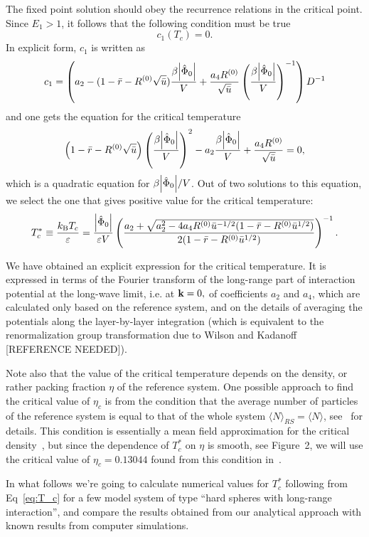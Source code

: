 The fixed point solution should obey the recurrence relations in the critical point. Since $E_1 > 1$, it follows that the following condition must be true
\begin{equation*}
	c_1(T_c) = 0.
\end{equation*}
In explicit form, $c_1$ is written as
\begin{equation*}
	c_1 = 
	\left(
		a_2 - (1 - \bar{r} - R^{(0)}\sqrt{\bar{u}})\frac{\beta \abs{\hat{\Phi}_0}}{V} + \frac{a_4 R^{(0)}}{\sqrt{\bar{u}}} \left(\frac{\beta \abs{\hat{\Phi}_0}}{V}\right)^{-1}
	\right) D^{-1}
\end{equation*}
and one gets the equation for the critical temperature
\begin{equation}
	\left(1 - \bar{r} - R^{(0)}\sqrt{\bar{u}} \right) \left(\frac{\beta \abs{\hat{\Phi}_0}}{V}\right)^{2} - a_2  \frac{\beta \abs{\hat{\Phi}_0}}{V} + \frac{a_4 R^{(0)}}{\sqrt{\bar{u}}} = 0,
\end{equation}
which is a quadratic equation for $\beta \abs{\hat{\Phi}_0}/{V}$. Out of two solutions to this equation, we select the one that gives positive value for the critical temperature:
\begin{equation}
	\label{eq:T_c}
	T^*_c \equiv \frac{k_{\rm B} T_c}{\varepsilon} = \frac{\abs{\hat{\Phi}_0}}{\varepsilon V}
	\left(
		\frac
		{a_2 + \sqrt{a_2^2 - 4 a_4 R^{(0)}\bar{u}^{-1/2} (1 - \bar{r} - R^{(0)}\bar{u}^{1/2}) } }
		{2(1 - \bar{r} - R^{(0)}\bar{u}^{1/2})}
	\right)^{-1}.
\end{equation}

We have obtained an explicit expression for the critical temperature. It is expressed in terms of the Fourier transform of the long-range part of interaction potential at the long-wave limit, i.e. at $\vb k = 0,$ of coefficients $a_2$ and $a_4$, which are calculated only based on the reference system, and on the details of averaging the potentials along the layer-by-layer integration (which is equivalent to the renormalization group transformation due to Wilson and Kadanoff [REFERENCE NEEDED]). 

Note also that the value of the critical temperature depends on the density, or rather packing fraction $\eta$ of the reference system. One possible approach to find the critical value of $\eta_c$ is from the condition that the average number of particles of the reference system is equal to that of the whole system $\langle N \rangle_{RS} = \langle N \rangle$, see~\cite{RomaJPS2024} for details. This condition is essentially a mean field approximation for the critical density~\cite{CaillolPatsahan2005,CaillolPatsahan2006}, but since the dependence of $T^*_c$ on $\eta$ is smooth, see Figure~2, we will use the critical value of $\eta_c = 0.13044$ found from this condition in~\cite{YukhJSP1995}.

In what follows we're going to calculate numerical values for $T^*_c$ following from Eq~\eqref{eq:T_c} for a few model system of type ``hard spheres with long-range interaction'', and compare the results obtained from our analytical approach with known results from computer simulations.
